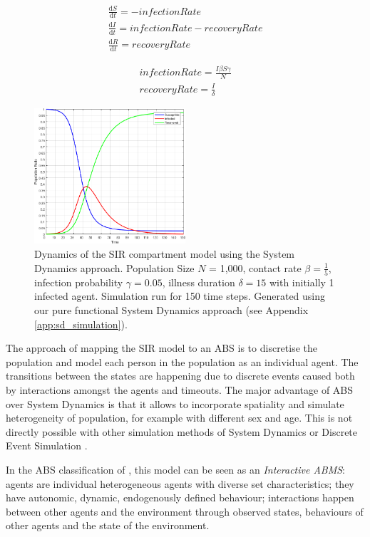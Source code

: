 \begin{equation}
\begin{aligned}
\frac{\mathrm d S}{\mathrm d t} = -infectionRate \\
\frac{\mathrm d I}{\mathrm d t} = infectionRate - recoveryRate \\
\frac{\mathrm d R}{\mathrm d t} = recoveryRate 
\end{aligned}
\end{equation}

\begin{equation}
\begin{aligned}
infectionRate = \frac{I \beta S \gamma}{N} \\
recoveryRate = \frac{I}{\delta} 
\end{aligned}
\end{equation}

\begin{figure}
	\centering
	\includegraphics[width=0.5\textwidth, angle=0]{./fig/timedriven/SIR_SD_1000agents_150t_001dt.png}
	\caption{Dynamics of the SIR compartment model using the System Dynamics approach. Population Size $N$ = 1,000, contact rate $\beta =  \frac{1}{5}$, infection probability $\gamma = 0.05$, illness duration $\delta = 15$ with initially 1 infected agent. Simulation run for 150 time steps. Generated using our pure functional System Dynamics approach (see Appendix \ref{app:sd_simulation}).}
	\label{fig:sir_sd_dynamics}
\end{figure}

The approach of mapping the SIR model to an ABS is to discretise the population and model each person in the population as an individual agent. The transitions between the states are happening due to discrete events caused both by interactions amongst the agents and timeouts. The major advantage of ABS over System Dynamics is that it allows to incorporate spatiality and simulate heterogeneity of population, for example with different sex and age. This is not directly possible with other simulation methods of System Dynamics or Discrete Event Simulation \cite{zeigler_theory_2000}.

In the ABS classification of \cite{macal_everything_2016}, this model can be seen as an \textit{Interactive ABMS}: agents are individual heterogeneous agents with diverse set characteristics; they have autonomic, dynamic, endogenously defined behaviour; interactions happen between other agents and the environment through observed states, behaviours of other agents and the state of the environment.